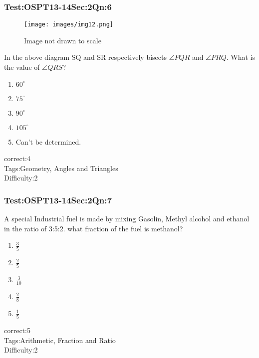 \documentclass[]{beamer}
\begin{document}
    \begin{frame}
	    \frametitle{Test:OSPT13-14\hspace{2mm}Sec:2\hspace{2mm}Qn:6}
	    \begin{figure}
	    \begin{center}
	    \texttt{[image: images/img12.png]}
	    \end{center}
	    {Image not drawn to scale}
	    \end{figure}
	    In the above diagram SQ and SR respectively bisects $\angle PQR$ and $\angle PRQ$. What is the value of $\angle QRS$?
	   \begin{enumerate}
	        \item
	           $60^\circ$
	        \item
	           $75^\circ$ 
	        \item
	           $90^\circ$
	        \item
	           $105^\circ$
	        \item
	           Can't be determined.
	    \end{enumerate}
	    correct:4\\   
	    Tags:Geometry, Angles and Triangles \\
	    Difficulty:2   \\
    \end{frame}    
    \begin{frame}
	    \frametitle{Test:OSPT13-14\hspace{2mm}Sec:2\hspace{2mm}Qn:7}
	    A special Industrial fuel is made by mixing Gasolin, Methyl alcohol and ethanol in the ratio of 3:5:2. what fraction of the fuel is methanol? 
	   \begin{enumerate}
	        \item
	            $\frac{3}{5}$
	        \item
	           $\frac{2}{5}$
	        \item
	           $\frac{3}{10}$
	        \item
	           $\frac{2}{8}$
	        \item
	            $\frac{1}{5}$
	    \end{enumerate}
	    correct:5\\   
	    Tags:Arithmetic, Fraction and Ratio \\
	    Difficulty:2   \\
    \end{frame}    
\end{document}
